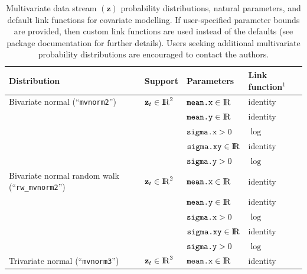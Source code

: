 \documentclass[12pt]{article}\usepackage[]{graphicx}\usepackage[]{color}
\begin{document}
\begin{small}
\begin{table}
  \caption{\label{tab:multipdfs} Multivariate data stream $({\mathbf z})$ probability distributions, natural parameters, and default link functions for covariate modelling. If user-specified parameter bounds are provided, then custom link functions are used instead of the defaults (see package documentation for further details). Users seeking additional multivariate probability distributions are encouraged to contact the authors.}
  \begin{tabular}{llll}
  \toprule
  Distribution                                          & Support                         & Parameters                       & Link function$^1$ \tabularnewline
  \midrule
  \rowcolor{Gray} Bivariate normal (``\verb|mvnorm2|'') & ${\mathbf z_t}\in{\rm I\!R}^2$  & $\verb|mean.x|\in{\rm I\!R}$     &  identity \tabularnewline  
  \rowcolor{Gray}                                       &                                 & $\verb|mean.y|\in{\rm I\!R}$     &  identity \tabularnewline  
  \rowcolor{Gray}                                       &                                 & $\verb|sigma.x|>0$               &  $\log$ \tabularnewline                                                
  \rowcolor{Gray}                                       &                                 & $\verb|sigma.xy|\in{\rm I\!R}$   &  identity \tabularnewline                                              
  \rowcolor{Gray}                                       &                                 & $\verb|sigma.y|>0$               &  $\log$ \tabularnewline  
  Bivariate normal random walk (``\verb|rw_mvnorm2|'')  & ${\mathbf z_t}\in{\rm I\!R}^2$  & $\verb|mean.x|\in{\rm I\!R}$     &  identity \tabularnewline  
                                                        &                                 & $\verb|mean.y|\in{\rm I\!R}$     &  identity \tabularnewline  
                                                        &                                 & $\verb|sigma.x|>0$               &  $\log$ \tabularnewline                                                                                                                      &                                 & $\verb|sigma.xy|\in{\rm I\!R}$   &  identity \tabularnewline                                                                                                                    &                                 & $\verb|sigma.y|>0$               &  $\log$ \tabularnewline
  \rowcolor{Gray} Trivariate normal (``\verb|mvnorm3|'')& ${\mathbf z_t}\in{\rm I\!R}^3$  & $\verb|mean.x|\in{\rm I\!R}$     &  identity \tabularnewline  

\end{tabular}
\end{table}
\end{small}
\end{document}
